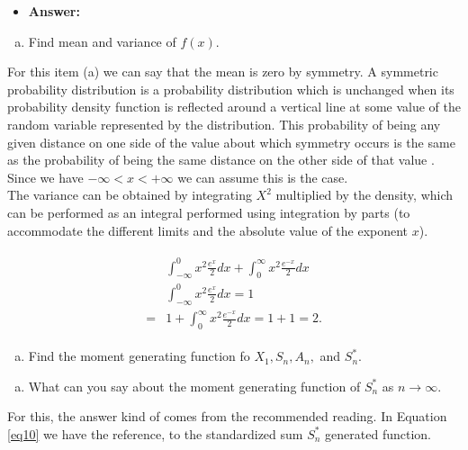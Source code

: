 \documentclass{article}
\begin{document}
\begin{itemize}
\item \textbf{Answer:}
\end{itemize}

\begin{enumerate}[(a)]
\item Find mean and variance of $f(x)$.
\end{enumerate}

For this item (a) we can say that the mean is zero by symmetry. A symmetric probability distribution is a probability distribution which is unchanged when its probability density function is reflected around a vertical line at some value of the random variable represented by the distribution. This probability of being any given distance on one side of the value about which symmetry occurs is the same as the probability of being the same distance on the other side of that value \cite{wiki}. Since we have $ -\infty < x < + \infty $ we can assume this is the case. \\

The variance can be obtained by integrating $X^2$ multiplied by the density, which can be performed as an integral performed using integration by parts (to accommodate the different limits and the absolute value of the exponent $x$).

\begin{eqnarray}
\label{eq9}
\begin{split}
&\int_{-\infty}^0 x^2 \frac{e^x}{2}dx + \int_0^{\infty} x^2 \frac{e^{-x}}{2}dx\\
&\int_{-\infty}^0 x^2 \frac{e^x}{2}dx = 1\\
=& 1 + \int_0^{\infty} x^2 \frac{e^{-x}}{2}dx =  1 + 1 = 2. 
\end{split}
\end{eqnarray}

\begin{enumerate}[(b)]
\item Find the moment generating function fo $X_1, S_n, A_n, $ and $S^{*}_n$.
\end{enumerate}

\begin{enumerate}[(c)]
\item What can you say about the moment generating function of $S^{*}_n$ as $n \rightarrow \infty$.
\end{enumerate}

For this, the answer kind of comes from the recommended reading. In Equation \ref{eq10} we have the reference, to the standardized sum $S_n^*$ generated function. 
\end{document}
